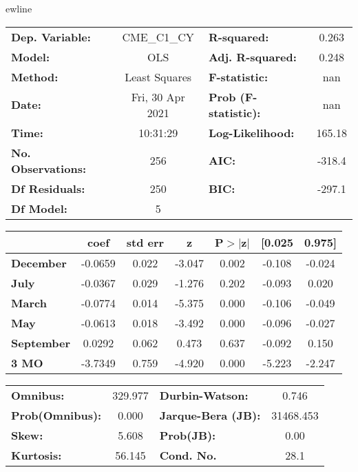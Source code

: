 ewline\begin{center}
\begin{tabular}{lclc}
\toprule
\textbf{Dep. Variable:}    &   CME\_C1\_CY    & \textbf{  R-squared:         } &     0.263   \\
\textbf{Model:}            &       OLS        & \textbf{  Adj. R-squared:    } &     0.248   \\
\textbf{Method:}           &  Least Squares   & \textbf{  F-statistic:       } &       nan   \\
\textbf{Date:}             & Fri, 30 Apr 2021 & \textbf{  Prob (F-statistic):} &      nan    \\
\textbf{Time:}             &     10:31:29     & \textbf{  Log-Likelihood:    } &    165.18   \\
\textbf{No. Observations:} &         256      & \textbf{  AIC:               } &    -318.4   \\
\textbf{Df Residuals:}     &         250      & \textbf{  BIC:               } &    -297.1   \\
\textbf{Df Model:}         &           5      & \textbf{                     } &             \\
\bottomrule
\end{tabular}
\begin{tabular}{lcccccc}
                   & \textbf{coef} & \textbf{std err} & \textbf{z} & \textbf{P$> |$z$|$} & \textbf{[0.025} & \textbf{0.975]}  \\
\midrule
\textbf{December}  &      -0.0659  &        0.022     &    -3.047  &         0.002        &       -0.108    &       -0.024     \\
\textbf{July}      &      -0.0367  &        0.029     &    -1.276  &         0.202        &       -0.093    &        0.020     \\
\textbf{March}     &      -0.0774  &        0.014     &    -5.375  &         0.000        &       -0.106    &       -0.049     \\
\textbf{May}       &      -0.0613  &        0.018     &    -3.492  &         0.000        &       -0.096    &       -0.027     \\
\textbf{September} &       0.0292  &        0.062     &     0.473  &         0.637        &       -0.092    &        0.150     \\
\textbf{3 MO}      &      -3.7349  &        0.759     &    -4.920  &         0.000        &       -5.223    &       -2.247     \\
\bottomrule
\end{tabular}
\begin{tabular}{lclc}
\textbf{Omnibus:}       & 329.977 & \textbf{  Durbin-Watson:     } &     0.746  \\
\textbf{Prob(Omnibus):} &   0.000 & \textbf{  Jarque-Bera (JB):  } & 31468.453  \\
\textbf{Skew:}          &   5.608 & \textbf{  Prob(JB):          } &      0.00  \\
\textbf{Kurtosis:}      &  56.145 & \textbf{  Cond. No.          } &      28.1  \\
\bottomrule
\end{tabular}
\end{center}

